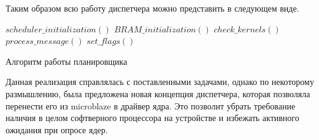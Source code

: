 Таким образом всю работу диспетчера можно представить в следующем виде.

  \begin{algo}
\begin{algorithmic}
	\STATE $scheduler\_initialization()$
	\STATE $BRAM\_initialization()$
	\WHILE {\TRUE}
		\STATE $check\_kernels()$
			\STATE $process\_message()$
			\STATE $set\_flags()$
		\ENDIF
	\ENDWHILE
\end{algorithmic}
  \caption{Алгоритм работы планировщика}
  \end{algo}
  
Данная реализация справлялась с поставленными задачами, однако по некоторому
размышлению, была предложена новая концепция диспетчера, которая позволяла
перенести его из microblaze в драйвер ядра. Это позволит убрать требование
наличия в целом софтверного процессора на устройстве и избежать активного
ожидания при опросе ядер.
